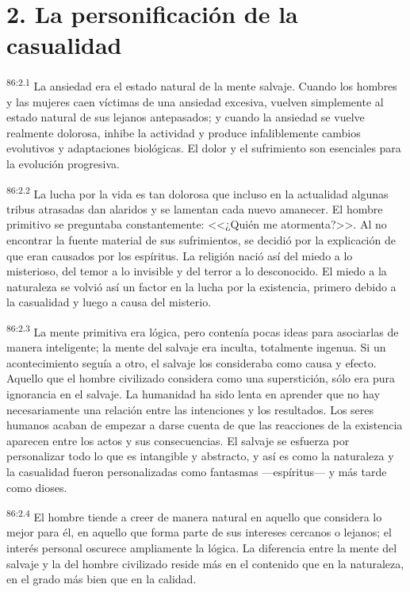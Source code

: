 \section*{2. La personificación de la casualidad}
\par
\textsuperscript{86:2.1} La ansiedad era el estado natural de la mente salvaje. Cuando los hombres y las mujeres caen víctimas de una ansiedad excesiva, vuelven simplemente al estado natural de sus lejanos antepasados; y cuando la ansiedad se vuelve realmente dolorosa, inhibe la actividad y produce infaliblemente cambios evolutivos y adaptaciones biológicas. El dolor y el sufrimiento son esenciales para la evolución progresiva.

\par
\textsuperscript{86:2.2} La lucha por la vida es tan dolorosa que incluso en la actualidad algunas tribus atrasadas dan alaridos y se lamentan cada nuevo amanecer. El hombre primitivo se preguntaba constantemente: <<¿Quién me atormenta?>>. Al no encontrar la fuente material de sus sufrimientos, se decidió por la explicación de que eran causados por los espíritus. La religión nació así del miedo a lo misterioso, del temor a lo invisible y del terror a lo desconocido. El miedo a la naturaleza se volvió así un factor en la lucha por la existencia, primero debido a la casualidad y luego a causa del misterio.

\par
\textsuperscript{86:2.3} La mente primitiva era lógica, pero contenía pocas ideas para asociarlas de manera inteligente; la mente del salvaje era inculta, totalmente ingenua. Si un acontecimiento seguía a otro, el salvaje los consideraba como causa y efecto. Aquello que el hombre civilizado considera como una superstición, sólo era pura ignorancia en el salvaje. La humanidad ha sido lenta en aprender que no hay necesariamente una relación entre las intenciones y los resultados. Los seres humanos acaban de empezar a darse cuenta de que las reacciones de la existencia aparecen entre los actos y sus consecuencias. El salvaje se esfuerza por personalizar todo lo que es intangible y abstracto, y así es como la naturaleza y la casualidad fueron personalizadas como fantasmas ---espíritus--- y más tarde como dioses.

\par
\textsuperscript{86:2.4} El hombre tiende a creer de manera natural en aquello que considera lo mejor para él, en aquello que forma parte de sus intereses cercanos o lejanos; el interés personal oscurece ampliamente la lógica. La diferencia entre la mente del salvaje y la del hombre civilizado reside más en el contenido que en la naturaleza, en el grado más bien que en la calidad.

